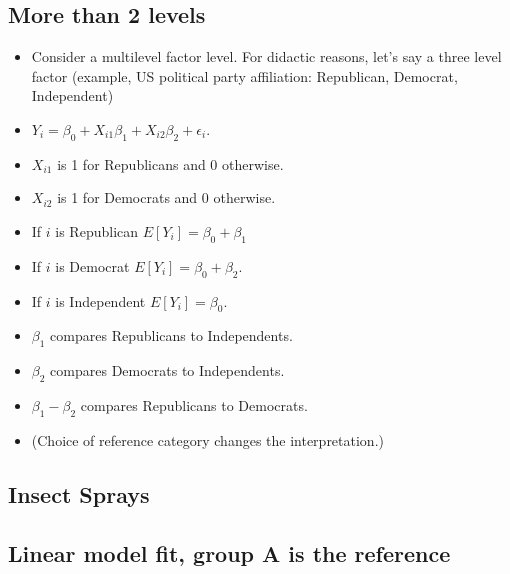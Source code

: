 \documentclass[12pt,]{04-class-files/abntex2}
\newenvironment{Shaded}{\begin{snugshade}}{\end{snugshade}}
\newcommand{\DataTypeTok}[1]{\textcolor[rgb]{0.13,0.29,0.53}{#1}}
\newcommand{\KeywordTok}[1]{\textcolor[rgb]{0.13,0.29,0.53}{\textbf{#1}}}
\newcommand{\NormalTok}[1]{#1}
\newcommand{\OperatorTok}[1]{\textcolor[rgb]{0.81,0.36,0.00}{\textbf{#1}}}
\newcommand{\StringTok}[1]{\textcolor[rgb]{0.31,0.60,0.02}{#1}}
\providecommand{\tightlist}{%
  \setlength{\itemsep}{0pt}\setlength{\parskip}{0pt}}
\begin{document}
\hypertarget{more-than-2-levels}{%
\subsection{More than 2 levels}\label{more-than-2-levels}}

\begin{itemize}
\tightlist
\item
  Consider a multilevel factor level. For didactic reasons, let's say a three level factor (example, US political party affiliation: Republican, Democrat, Independent)
\item
  \(Y_i = \beta_0 + X_{i1} \beta_1 + X_{i2} \beta_2 + \epsilon_i\).
\item
  \(X_{i1}\) is 1 for Republicans and 0 otherwise.
\item
  \(X_{i2}\) is 1 for Democrats and 0 otherwise.
\item
  If \(i\) is Republican \(E[Y_i] = \beta_0 +\beta_1\)
\item
  If \(i\) is Democrat \(E[Y_i] = \beta_0 + \beta_2\).
\item
  If \(i\) is Independent \(E[Y_i] = \beta_0\).
\item
  \(\beta_1\) compares Republicans to Independents.
\item
  \(\beta_2\) compares Democrats to Independents.
\item
  \(\beta_1 - \beta_2\) compares Republicans to Democrats.
\item
  (Choice of reference category changes the interpretation.)
\end{itemize}

\hypertarget{insect-sprays}{%
\subsection{Insect Sprays}\label{insect-sprays}}

\hypertarget{linear-model-fit-group-a-is-the-reference}{%
\subsection{Linear model fit, group A is the reference}\label{linear-model-fit-group-a-is-the-reference}}

\begin{Shaded}
\end{Shaded}
\end{document}
